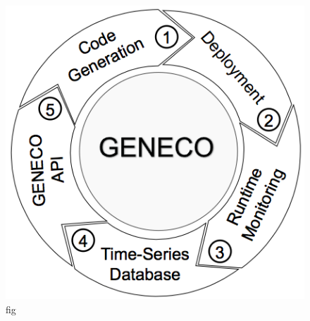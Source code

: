\begin{figure}[!t]
	\centering
	\includegraphics[width=1\hsize]{Ressources/genecoApproach22.png}
	\caption{fig}
\end{figure}
\iffalse
